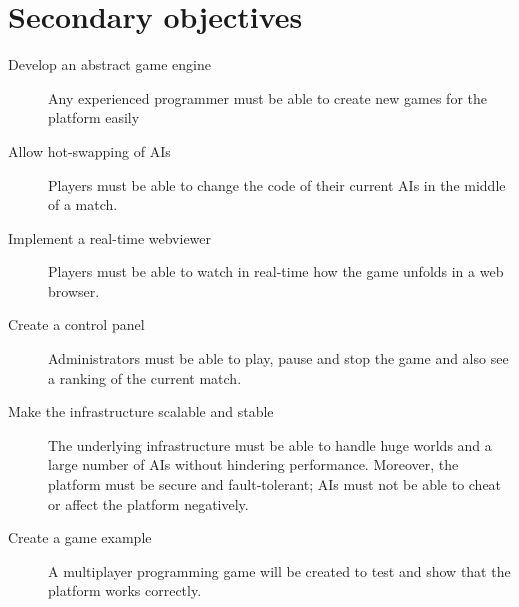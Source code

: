 \documentclass[a4paper,11pt,titlepage,abstract,numbers=noenddot,automark,mnsy,intlimits,rgb,dvipsnames]{report}
\begin{document}
\section{Secondary objectives}
\label{secondary_objectives}
\begin{description}
\item[Develop an abstract game engine]
Any experienced programmer must be able to create new games for the platform easily
\item[Allow hot-swapping of AIs]
Players must be able to change the code of their current AIs in the middle of a match.
\item[Implement a real-time webviewer]
Players must be able to watch in real-time how the game unfolds in a web browser.
\item[Create a control panel]
Administrators must be able to play, pause and stop the game and also see a ranking of the current match.
\item[Make the infrastructure scalable and stable]
The underlying infrastructure must be able to handle huge worlds and a large number of \texttt{}AI\texttt{}s without
  hindering performance. Moreover, the platform must be secure and fault-tolerant; AIs must not be able to cheat
  or affect the platform negatively.
\item[Create a game example]
A multiplayer programming game will be created to test and show that the platform works correctly.
\end{description}
\clearpage
\end{document}
